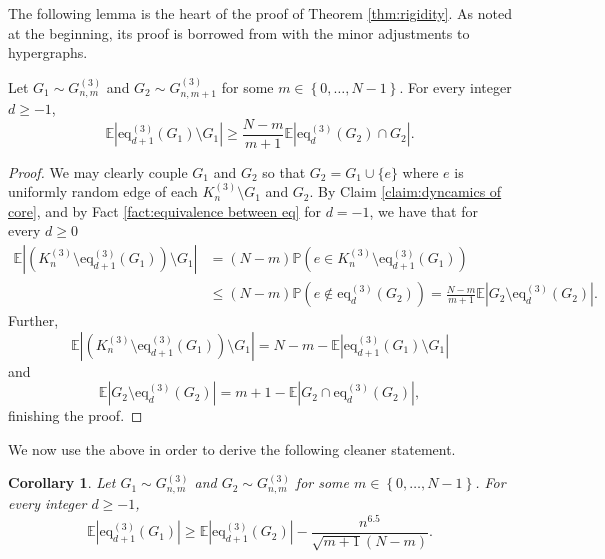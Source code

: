 \documentclass[11pt,a4paper,oneside,reqno]{amsart}
\newtheorem{cor}[thm]{Corollary}
\renewcommand{\Pr}{\mathbb{P}}
\newcommand{\Ex}{\mathbb{E}}
\newcommand{\1}{\mathbbm{1}} %
\renewcommand{\le}{\leqslant}
\renewcommand{\ge}{\geqslant}
\newcommand{\eq}{\mathrm{eq}}
\begin{document}
The following lemma is the heart of the proof of Theorem \ref{thm:rigidity}. As noted at the beginning, its proof is borrowed from \cite{hoshen2024stabilitylargecutsrandom} with the minor adjustments to hypergraphs.
\begin{lemma}\label{lemma:transition-lemma}
    Let $G_1 \sim G_{n, m}^{(3)}$ and $G_2 \sim G_{n, m+1}^{(3)}$ for some $m \in \left\{0, \dots, N-1\right\}$. For every integer $d \ge -1$,
    \[
        \Ex\left| \eq_{d+1}^{(3)}(G_1) \setminus G_1\right| \ge \frac{N - m}{m + 1} \Ex\left|\eq_{d}^{(3)}(G_2) \cap G_2\right|.
    \]
\end{lemma}
\begin{proof}
    We may clearly couple $G_1$ and $G_2$ so that $G_2 = G_1 \cup \{e\}$ where $e$ is uniformly random edge of each $K_n^{(3)} \setminus G_1$ and $G_2$. By Claim \ref{claim:dyncamics of core}, and by Fact \ref{fact:equivalence between eq} for $d=-1$, we have that for every $d \ge 0$
    \begin{align*}
        \Ex\left| \left(K_n^{(3)} \setminus \eq_{d+1}^{(3)}(G_1)\right) \setminus G_1 \right| &= (N-m) \Pr\left(e \in K_n^{(3)} \setminus \eq_{d+1}^{(3)}(G_1)\right) \\
        &\le (N-m) \Pr\left(e \notin \eq_d^{(3)}(G_2)\right) = \frac{N-m}{m+1} \Ex\left| G_2 \setminus \eq_d^{(3)}(G_2) \right|.
    \end{align*}
    Further,
    \[
        \Ex\left| \left(K_n^{(3)} \setminus \eq_{d+1}^{(3)}(G_1)\right) \setminus G_1 \right| = N-m - \Ex\left| \eq_{d+1}^{(3)}(G_1) \setminus G_1 \right|
    \]
    and
    \[
        \Ex\left| G_2 \setminus \eq_d^{(3)}(G_2) \right| = m+1 - \Ex\left| G_2 \cap \eq_d^{(3)}(G_2) \right|,
    \]
    finishing the proof.
\end{proof}
We now use the above in order to derive the following cleaner statement.
\begin{cor}\label{cor:eq_d+1-eq_d}
    Let $G_1 \sim G_{n, m}^{(3)}$ and $G_2 \sim G_{n, m}^{(3)}$ for some $m \in \left\{0, \dots, N-1\right\}$. For every integer $d \ge -1$,
    \[
        \Ex\left|\eq_{d+1}^{(3)}(G_1)\right| \ge \Ex\left|\eq_{d+1}^{(3)}(G_2)\right| - \frac{n^{6.5}}{\sqrt{m+1}(N-m)}.
    \]    
\end{cor}
\end{document}
